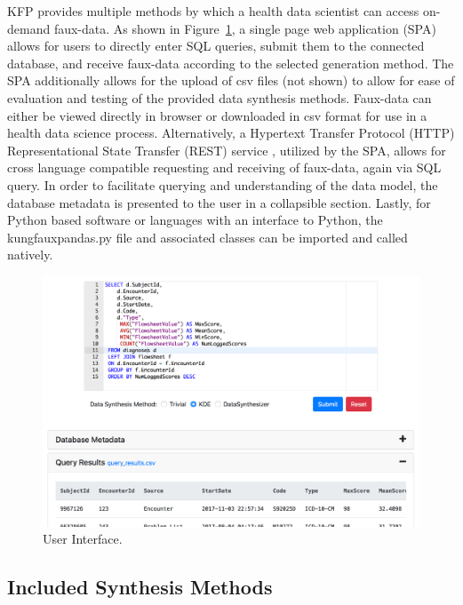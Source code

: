 \documentclass{amia}
\begin{document}
KFP provides multiple methods by which a health data scientist can access on-demand faux-data. As shown in Figure~\ref{fig:ui}, a single page web application (SPA) allows for users to directly enter SQL queries, submit them to the connected database, and receive faux-data according to the selected generation method. The SPA additionally allows for the upload of csv files (not shown) to allow for ease of evaluation and testing of the provided data synthesis methods. Faux-data can either be viewed directly in browser or downloaded in csv format for use in a health data science process. Alternatively, a Hypertext Transfer Protocol (HTTP) Representational State Transfer (REST) service \cite{w3c_working_group_webservices}, utilized by the SPA, allows for cross language compatible requesting and receiving of faux-data, again via SQL query. In order to facilitate querying and understanding of the data model, the database metadata is presented to the user in a collapsible section. Lastly, for Python based software or languages with an interface to Python, the kungfauxpandas.py file and associated classes can be imported and called natively.

\begin{figure}[ht]
  \centering
  \includegraphics[width=\textwidth]{ui_screenshot3}
  \caption{User Interface.}
  \label{fig:ui}
\end{figure}


\subsection{Included Synthesis Methods}
\end{document}
